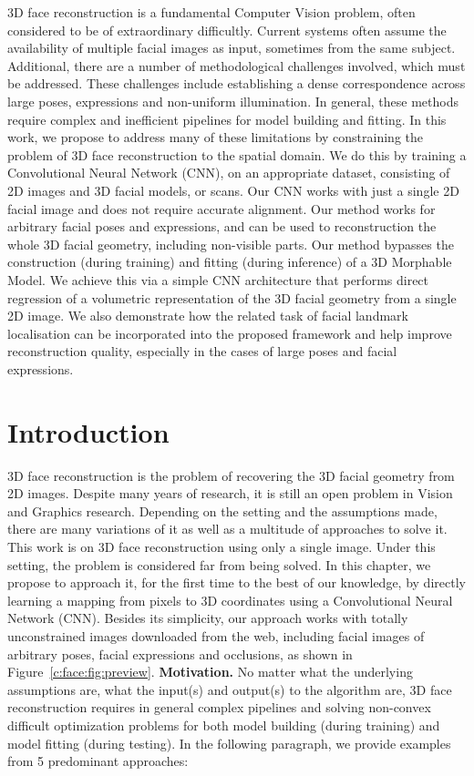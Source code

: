 3D face reconstruction is a fundamental Computer Vision problem, often
considered to be of extraordinary difficultly. Current systems often
assume the availability of multiple facial images as input, sometimes
from the same subject. Additional, there are a number of
methodological challenges involved, which must be addressed. These
challenges include establishing a dense correspondence across large
poses, expressions and non-uniform illumination. In general, these
methods require complex and inefficient pipelines for model building
and fitting. In this work, we propose to address many of these
limitations by constraining the problem of 3D face reconstruction to
the spatial domain. We do this by training a Convolutional Neural
Network (CNN), on an appropriate dataset, consisting of 2D images and
3D facial models, or scans. Our CNN works with just a single 2D facial
image and does not require accurate alignment. Our method works for
arbitrary facial poses and expressions, and can be used to
reconstruction the whole 3D facial geometry, including non-visible
parts. Our method bypasses the construction (during training) and
fitting (during inference) of a 3D Morphable Model. We achieve this via
a simple CNN architecture that performs direct regression of a
volumetric representation of the 3D facial geometry from a single 2D
image. We also demonstrate how the related task of facial landmark
localisation can be incorporated into the proposed framework and help
improve reconstruction quality, especially in the cases of large poses
and facial expressions.


\section{Introduction}
3D face reconstruction is the problem of recovering the 3D facial
geometry from 2D images. Despite many years of research, it is still
an open problem in Vision and Graphics research. Depending on the
setting and the assumptions made, there are many variations of it as
well as a multitude of approaches to solve it. This work is on 3D face
reconstruction using only a single image. Under this setting, the
problem is considered far from being solved. In this chapter, we
propose to approach it, for the first time to the best of our
knowledge, by directly learning a mapping from pixels to 3D
coordinates using a Convolutional Neural Network (CNN). Besides its
simplicity, our approach works with totally unconstrained images
downloaded from the web, including facial images of arbitrary poses,
facial expressions and occlusions, as shown in
Figure~\ref{c:face:fig:preview}. \newline \textbf{Motivation.} No matter what
the underlying assumptions are, what the input(s) and output(s) to the
algorithm are, 3D face reconstruction requires in general complex
pipelines and solving non-convex difficult optimization problems for
both model building (during training) and model fitting (during
testing). In the following paragraph, we provide examples from 5
predominant approaches:

